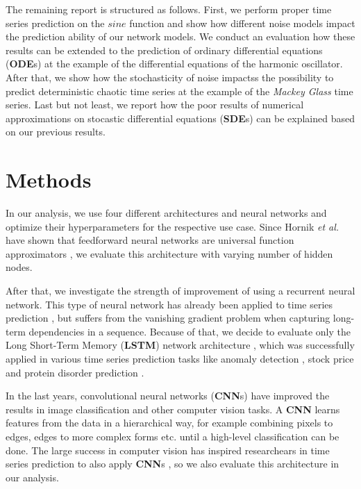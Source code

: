 \documentclass{article}
\begin{document}
The remaining report is structured as follows. First, we perform proper time 
series prediction on the $sine$ function and show how different noise models
impact the prediction ability of our network models. We conduct an evaluation
how these results can be extended to the prediction of 
ordinary differential equations (\textbf{ODE}s) at the example of the 
differential equations of the harmonic oscillator. After that, we show how the
stochasticity of noise impactss the possibility to predict deterministic
chaotic time series at the example of the \emph{Mackey Glass} time series. Last
but not least, we report how the poor results of numerical approximations on 
stocastic differential equations (\textbf{SDE}s) can be explained based on our
previous results.

\section{Methods}

In our analysis, we use four different architectures and neural networks and
optimize their hyperparameters for the respective use case. Since Hornik 
\textit{et al.} have shown that feedforward neural networks are universal 
function approximators \cite{hornik1989}, we evaluate this architecture with 
varying number of hidden nodes. 

After that, we investigate the strength of
improvement of using a recurrent neural network. This type of neural network has
already been applied to time series prediction \cite{connor1994}, but suffers
from the vanishing gradient problem when capturing long-term dependencies in a 
sequence. Because of that, we decide to evaluate only the Long Short-Term Memory
(\textbf{LSTM})
network architecture \cite{hochreiter1997}, which was successfully applied in 
various time series prediction tasks like anomaly detection \cite{malhotra2015},
stock price \cite{fischer2018} and protein disorder prediction 
\cite{hanson2016}.

In the last years, convolutional neural networks (\textbf{CNN}s) have improved
the results in image classification \cite{krizhevsky2012} and other computer
vision tasks. A \textbf{CNN} learns features from the data in a hierarchical
way, for example combining pixels to edges, edges to more complex forms etc.
until a high-level classification can be done. The large success in computer
vision has inspired researchears in time series prediction to also apply
\textbf{CNN}s \cite{cui2016, borovykh2017}, so we also evaluate this 
architecture in our analysis.
\end{document}

